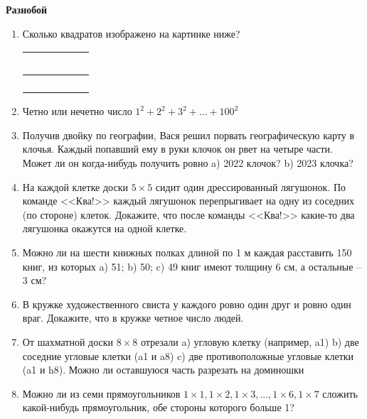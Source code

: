 \documentclass{article}
\begin{document}
\large
	
\begin{center}
	\textbf{Разнобой}
\end{center}


\begin{enumerate}[label*=\protect\fbox{\arabic{enumi}}]
	
\item Сколько квадратов изображено на картинке ниже?

\begin{table}[h]
	\centering
	\begin{tabular}{|c|c|c|c|c|} \hline
		\, & \, & \, & \, & \, \\\hline
		 &  &  &  & \\\hline
		 &  &  &  & \\\hline
		 &  &  &  & \\\hline
		 &  &  &  & \\\hline
	 \end{tabular}
\end{table}

\item Четно или нечетно число $1^2 +2^2 +3^2 +\dotsc+100^2$

\item Получив двойку по географии, Вася решил порвать географическую карту в клочья. Каждый попавший ему в руки клочок он рвет на четыре части. Может ли он когда-нибудь получить ровно a) 2022 клочок? b) 2023 клочка?

\item На каждой клетке доски $5 \times 5$ сидит один дрессированный лягушонок. По команде <<Ква!>> каждый лягушонок перепрыгивает на одну из соседних (по стороне) клеток. Докажите, что после команды <<Ква!>> какие-то два лягушонка окажутся на одной клетке.

\item Можно ли на шести книжных полках длиной по 1 м каждая расставить 150 книг, из которых a) 51; b) 50; c) 49 книг имеют толщину 6 см, а остальные – 3 см?

\item В кружке художественного свиста у каждого ровно один друг и ровно один враг. Докажите, что в кружке четное число людей.

\item От шахматной доски $8 \times 8$ отрезали a) угловую клетку (например, a1) b) две соседние угловые клетки (a1 и a8) c) две противоположные угловые клетки (a1 и h8). Можно ли оставшуюся часть разрезать на доминошки

\item Можно ли из семи прямоугольников $1 \times1, 1 \times2, 1 \times3, ..., 1 \times6, 1 \times7$ сложить какой-нибудь прямоугольник, обе стороны которого больше 1?

\end{enumerate}
\end{document}
